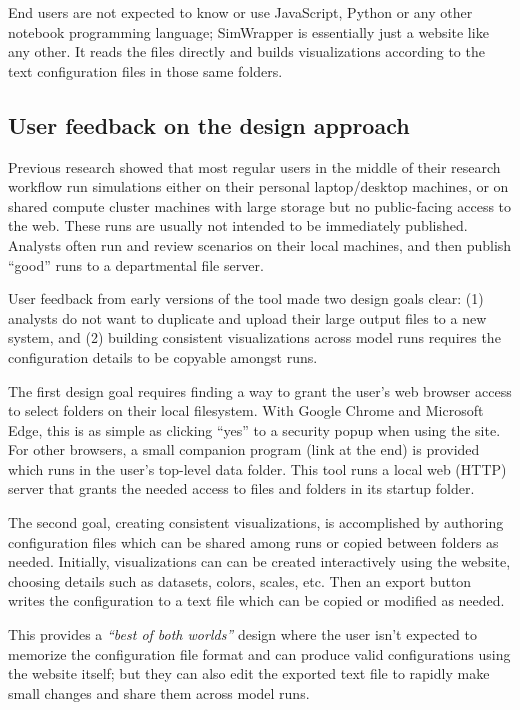 \documentclass[3p,times,procedia]{elsarticle}
\begin{document}
End users are not expected to know or use JavaScript, Python or any other notebook programming language; SimWrapper is essentially just a website like any other. It reads the files directly and builds visualizations according to the text configuration files in those same folders.

\subsection{User feedback on the design approach}

Previous research showed that most regular users in the middle of their research workflow run simulations either on their personal laptop/desktop machines, or on shared compute cluster machines with large storage but no public-facing access to the web. These runs are usually not intended to be immediately published. Analysts often run and review scenarios on their local machines, and then publish “good” runs to a departmental file server.

User feedback from early versions of the tool made two design goals clear: (1) analysts do not want to duplicate and upload their large output files to a new system, and (2) building consistent visualizations across model runs requires the configuration details to be copyable amongst runs.

The first design goal requires finding a way to grant the user's web browser access to select folders on their local filesystem. With Google Chrome and Microsoft Edge, this is as simple as clicking “yes” to a security popup when using the site. For other browsers, a small companion program (link at the end) is provided which runs in the user's top-level data folder. This tool runs a local web (HTTP) server that grants the needed access to files and folders in its startup folder.

The second goal, creating consistent visualizations, is accomplished by authoring configuration files which can be shared among runs or copied between folders as needed. Initially, visualizations can can be created interactively using the website, choosing details such as datasets, colors, scales, etc. Then an export button writes the configuration to a text file which can be copied or modified as needed.

This provides a \textit{``best of both worlds''} design where the user isn't expected to memorize the configuration file format and can produce valid configurations using the website itself; but they can also edit the exported text file to rapidly make small changes and share them across model runs.
\end{document}
